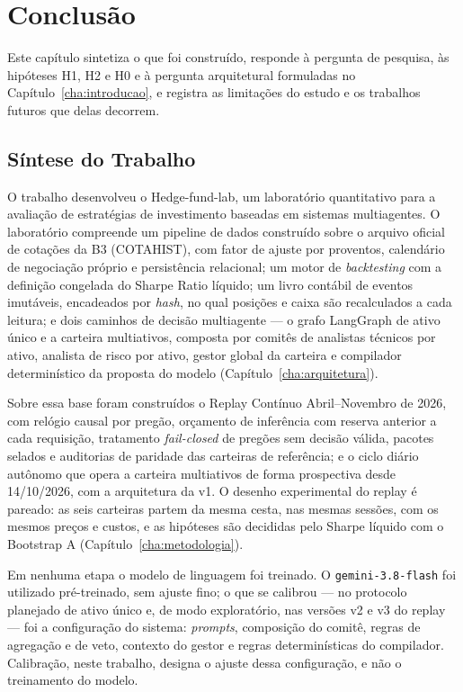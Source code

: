 \chapter{Conclusão}
\label{cha:conclusao}

Este capítulo sintetiza o que foi construído, responde à pergunta de pesquisa, às hipóteses H1, H2 e H0 e à pergunta arquitetural formuladas no Capítulo~\ref{cha:introducao}, e registra as limitações do estudo e os trabalhos futuros que delas decorrem.

\section{Síntese do Trabalho}

O trabalho desenvolveu o Hedge-fund-lab, um laboratório quantitativo para a avaliação de estratégias de investimento baseadas em sistemas multiagentes. O laboratório compreende um pipeline de dados construído sobre o arquivo oficial de cotações da B3 (COTAHIST), com fator de ajuste por proventos, calendário de negociação próprio e persistência relacional; um motor de \textit{backtesting} com a definição congelada do Sharpe Ratio líquido; um livro contábil de eventos imutáveis, encadeados por \textit{hash}, no qual posições e caixa são recalculados a cada leitura; e dois caminhos de decisão multiagente --- o grafo LangGraph de ativo único e a carteira multiativos, composta por comitês de analistas técnicos por ativo, analista de risco por ativo, gestor global da carteira e compilador determinístico da proposta do modelo (Capítulo~\ref{cha:arquitetura}).

Sobre essa base foram construídos o Replay Contínuo Abril--Novembro de 2026, com relógio causal por pregão, orçamento de inferência com reserva anterior a cada requisição, tratamento \textit{fail-closed} de pregões sem decisão válida, pacotes selados e auditorias de paridade das carteiras de referência; e o ciclo diário autônomo que opera a carteira multiativos de forma prospectiva desde 14/10/2026, com a arquitetura da v1. O desenho experimental do replay é pareado: as seis carteiras partem da mesma cesta, nas mesmas sessões, com os mesmos preços e custos, e as hipóteses são decididas pelo Sharpe líquido com o Bootstrap A (Capítulo~\ref{cha:metodologia}).

Em nenhuma etapa o modelo de linguagem foi treinado. O \texttt{gemini-3.8-flash} foi utilizado pré-treinado, sem ajuste fino; o que se calibrou --- no protocolo planejado de ativo único e, de modo exploratório, nas versões v2 e v3 do replay --- foi a configuração do sistema: \textit{prompts}, composição do comitê, regras de agregação e de veto, contexto do gestor e regras determinísticas do compilador. Calibração, neste trabalho, designa o ajuste dessa configuração, e não o treinamento do modelo.

